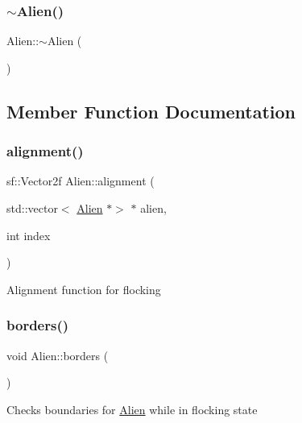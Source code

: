 \mbox{\label{class_alien_a7cdfd79d84b51a18003bf41585aedd43}} 
\subsubsection{\texorpdfstring{$\sim$\+Alien()}{~Alien()}}
{\footnotesize\ttfamily Alien\+::$\sim$\+Alien (\begin{DoxyParamCaption}{ }\end{DoxyParamCaption})}



\subsection{Member Function Documentation}
\mbox{\label{class_alien_a9c94d5f45dc31fdda1ef096cf3e60920}} 
\subsubsection{\texorpdfstring{alignment()}{alignment()}}
{\footnotesize\ttfamily sf\+::\+Vector2f Alien\+::alignment (\begin{DoxyParamCaption}\item[{std\+::vector$<$ \hyperlink{class_alien}{Alien} $\ast$$>$ $\ast$}]{alien,  }\item[{int}]{index }\end{DoxyParamCaption})}

Alignment function for flocking \mbox{\label{class_alien_a768bd4e8f7b409f8a7c3b4ac6cdd598f}} 
\subsubsection{\texorpdfstring{borders()}{borders()}}
{\footnotesize\ttfamily void Alien\+::borders (\begin{DoxyParamCaption}{ }\end{DoxyParamCaption})}

Checks boundaries for \hyperlink{class_alien}{Alien} while in flocking state \mbox{\label{class_alien_a1f94914265a34170958fbf0cc4dbf187}} 
